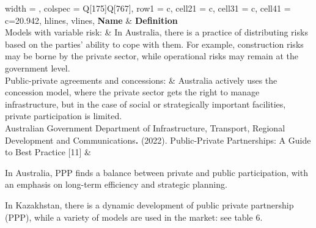 \begin{longtblr}[
  label = none,
  entry = none,
]{
  width = \linewidth,
  colspec = {Q[175]Q[767]},
  row{1} = {c},
  cell{2}{1} = {c},
  cell{3}{1} = {c},
  cell{4}{1} = {c=2}{0.942\linewidth},
  hlines,
  vlines,
}
\textbf{Name} & \textbf{Definition}\\
Models
			with variable risk: & In
			Australia, there is a practice of distributing risks based on the
			parties' ability to cope with them. For example, construction
			risks may be borne by the private sector, while operational risks
			may remain at the government level.\\
Public-private
			agreements and concessions: & Australia
			actively uses the concession model, where the private sector gets
			the right to manage infrastructure, but in the case of social or
			strategically important facilities, private participation is
			limited.\\
Australian			Government Department of Infrastructure, Transport, Regional			Development and Communications\textbf{.			}(2022).			Public-Private Partnerships: A Guide to Best Practice [11] & 
\end{longtblr}

\begin{multicols}{2}
In Australia, PPP finds a balance between private and public
participation, with an emphasis on long-term efficiency and strategic
planning.

In Kazakhstan, there is a dynamic development of public private
partnership (PPP), while a variety of models are used in the market: see
table 6.
\end{multicols}

